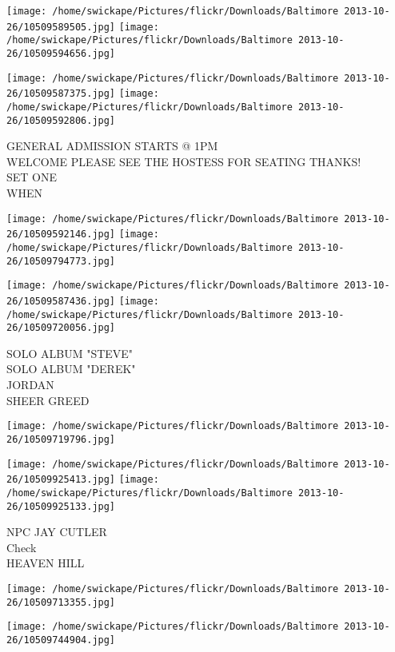 \documentclass[10pt,letterpaper]{article}
\begin{document}
\texttt{[image: /home/swickape/Pictures/flickr/Downloads/Baltimore 2013-10-26/10509589505.jpg]}
\texttt{[image: /home/swickape/Pictures/flickr/Downloads/Baltimore 2013-10-26/10509594656.jpg]}

\texttt{[image: /home/swickape/Pictures/flickr/Downloads/Baltimore 2013-10-26/10509587375.jpg]}
\texttt{[image: /home/swickape/Pictures/flickr/Downloads/Baltimore 2013-10-26/10509592806.jpg]}

GENERAL ADMISSION STARTS @ 1PM\\
WELCOME PLEASE SEE THE HOSTESS FOR SEATING THANKS!\\
SET ONE\\
WHEN\\
\pagebreak

\texttt{[image: /home/swickape/Pictures/flickr/Downloads/Baltimore 2013-10-26/10509592146.jpg]}
\texttt{[image: /home/swickape/Pictures/flickr/Downloads/Baltimore 2013-10-26/10509794773.jpg]}

\texttt{[image: /home/swickape/Pictures/flickr/Downloads/Baltimore 2013-10-26/10509587436.jpg]}
\texttt{[image: /home/swickape/Pictures/flickr/Downloads/Baltimore 2013-10-26/10509720056.jpg]}

SOLO ALBUM "STEVE"\\
SOLO ALBUM "DEREK"\\
JORDAN\\
SHEER GREED\\
\pagebreak

\texttt{[image: /home/swickape/Pictures/flickr/Downloads/Baltimore 2013-10-26/10509719796.jpg]}

\vspace{0.25in}
\texttt{[image: /home/swickape/Pictures/flickr/Downloads/Baltimore 2013-10-26/10509925413.jpg]}
\texttt{[image: /home/swickape/Pictures/flickr/Downloads/Baltimore 2013-10-26/10509925133.jpg]}

NPC JAY CUTLER\\
Check\\
HEAVEN HILL\\
\pagebreak

\texttt{[image: /home/swickape/Pictures/flickr/Downloads/Baltimore 2013-10-26/10509713355.jpg]}

\vspace{0.25in}
\texttt{[image: /home/swickape/Pictures/flickr/Downloads/Baltimore 2013-10-26/10509744904.jpg]}
\end{document}
